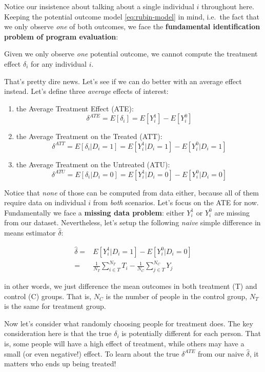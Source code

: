 \documentclass[]{book}
\providecommand{\tightlist}{%
  \setlength{\itemsep}{0pt}\setlength{\parskip}{0pt}}
\newenvironment{warning}{\begin{tcolorbox}[colback=orange!5!white,colframe=orange]}{\end{tcolorbox}}
\begin{document}
Notice our insistence about talking about a single individual \(i\)
throughout here. Keeping the potential outcome model
\eqref{eq:rubin-model} in mind, i.e.~the fact that we only observe
\emph{one} of both outcomes, we face the \textbf{fundamental
identification problem of program evaluation}:

\begin{warning}
Given we only observe \emph{one} potential outcome, we cannot compute
the treatment effect \(\delta_i\) for any individual \(i\).
\end{warning}

 That's pretty dire news. Let's see if we can do better with an average
effect instead. Let's define three \emph{average} effects of interest:

\begin{enumerate}
\def\labelenumi{\arabic{enumi}.}
\tightlist
\item
  the Average Treatment Effect (ATE):
  \[\delta^{ATE} = E[\delta_i] = E[Y_i^1] - E[Y_i^0]\]
\item
  the Average Treatment on the Treated (ATT):
  \[\delta^{ATT} = E[\delta_i|D_i = 1] = E[Y_i^1|D_i = 1] - E[Y_i^0|D_i = 1]\]
\item
  the Average Treatment on the Untreated (ATU):
  \[\delta^{ATU} = E[\delta_i|D_i = 0] = E[Y_i^1|D_i = 0] - E[Y_i^0|D_i = 0]\]
\end{enumerate}

Notice that \emph{none} of those can be computed from data either,
because all of them require data on individual \(i\) from \emph{both}
scenarios. Let's focus on the ATE for now. Fundamentally we face a
\textbf{missing data problem}: either \(Y_i^1\) or \(Y_i^0\) are missing
from our dataset. Nevertheless, let's setup the following \emph{naive}
simple difference in means estimator \(\hat{\delta}\):

\begin{align}
\hat{\delta} =& E[Y_i^1|D_i = 1] - E[Y_i^0|D_i = 0]\\
             =& \frac{1}{N_T} \sum_{i \in T}^{N_T} T_i - \frac{1}{N_C} \sum_{j \in T}^{N_C} Y_j \label{eq:SDO}
\end{align}

in other words, we just difference the mean outcomes in both treatment
(T) and control (C) groups. That is, \(N_C\) is the number of people in
the control group, \(N_T\) is the same for treatment group.

Now let's consider what randomly choosing people for treatment does. The
key consideration here is that the true \(\delta_i\) is potentially
different for each person. That is, some people will have a high effect
of treatment, while others may have a small (or even negative!) effect.
To learn about the true \(\delta^{ATE}\) from our naive
\(\hat{\delta}\), it matters who ends up being treated!
\end{document}
